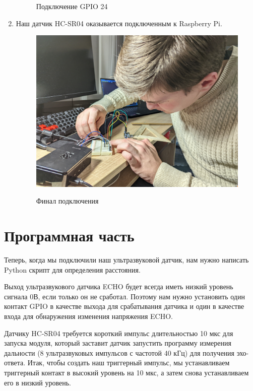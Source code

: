 \documentclass[a4paper, 14pt]{article}
\begin{document}
\begin{enumerate}
\begin{figure}[H]
		      \caption{Подключение GPIO 24}
	      \end{figure}
	\item Наш датчик HC-SR04 оказывается подключенным к Raspberry Pi.
	      \begin{figure}[H]
		      \centering
		      \includegraphics[width=14cm]{screenshots/11.png}\\
		      \caption{Финал подключения}
	      \end{figure}
\end{enumerate}

\newpage
\section{Программная часть}

Теперь, когда мы подключили наш ультразвуковой датчик, нам нужно написать Python скрипт для определения расстояния.

Выход ультразвукового датчика ECHO будет всегда иметь низкий уровень сигнала 0В, если только он не сработал. Поэтому нам нужно установить один контакт GPIO в качестве выхода для срабатывания датчика и один в качестве входа для обнаружения изменения напряжения ECHO.

Датчику HC-SR04 требуется короткий импульс длительностью 10 мкс для запуска модуля, который заставит датчик запустить программу измерения дальности (8 ультразвуковых импульсов с частотой 40 кГц) для получения эхо-ответа. Итак, чтобы создать наш триггерный импульс, мы устанавливаем триггерный контакт в высокий уровень на 10 мкс, а затем снова устанавливаем его в низкий уровень.
\end{document}
